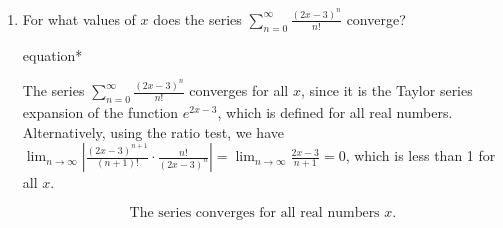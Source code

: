 \documentclass[12pt]{article}
\begin{document}
\begin{enumerate}
	\item For what values of $x$ does the series $\sum_{n=0}^{\infty} \frac{(2x-3)^n}{n!}$ converge?
	      \begin{empheq}[box=\tcbhighmath]{equation*}
	      	\parbox{6in}{The series $\sum_{n=0}^{\infty} \frac{(2x-3)^n}{n!}$ converges for all $x$, since it is the Taylor series expansion of the function $e^{2x-3}$, which is defined for all real numbers. Alternatively, using the ratio test, we have $\lim_{n\to\infty} \left| \frac{(2x-3)^{n+1}}{(n+1)!} \cdot \frac{n!}{(2x-3)^n} \right| = \lim_{n\to\infty} \frac{2x-3}{n+1} = 0$, which is less than 1 for all $x$.}
	      \end{empheq}
	      $$\boxed{\text{The series converges for all real numbers $x$.}}$$
	             

\end{enumerate}
\end{document}
